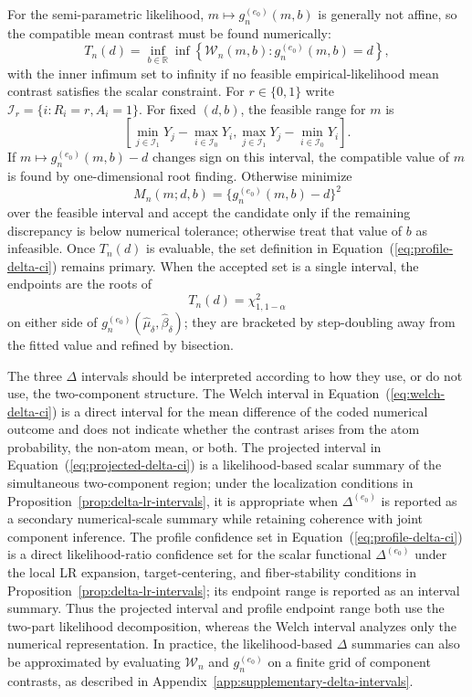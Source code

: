 \documentclass[11pt]{article}
\begin{document}
For the semi-parametric likelihood, $m\mapsto g_n^{(e_0)}(m,b)$ is generally not affine, so the compatible mean contrast must be found numerically:
\[
  T_n(d)
  =
  \inf_{b\in\mathbb{R}}
  \inf\left\{
    \mathcal{W}_n(m,b):
    g_n^{(e_0)}(m,b)=d
  \right\},
\]
with the inner infimum set to infinity if no feasible empirical-likelihood mean contrast satisfies the scalar constraint. For $r\in\{0,1\}$ write $\mathcal{I}_r=\{i:R_i=r,A_i=1\}$. For fixed $(d,b)$, the feasible range for $m$ is
\[
  \left[
    \min_{j\in\mathcal{I}_1}Y_j-
    \max_{i\in\mathcal{I}_0}Y_i,
    \max_{j\in\mathcal{I}_1}Y_j-
    \min_{i\in\mathcal{I}_0}Y_i
  \right].
\]
If $m\mapsto g_n^{(e_0)}(m,b)-d$ changes sign on this interval, the compatible value of $m$ is found by one-dimensional root finding. Otherwise minimize
\[
  M_n(m;d,b)=\{g_n^{(e_0)}(m,b)-d\}^2
\]
over the feasible interval and accept the candidate only if the remaining discrepancy is below numerical tolerance; otherwise treat that value of $b$ as infeasible. Once $T_n(d)$ is evaluable, the set definition in Equation~(\ref{eq:profile-delta-ci}) remains primary. When the accepted set is a single interval, the endpoints are the roots of
\[
  T_n(d)=\chi^2_{1,1-\alpha}
\]
on either side of $g_n^{(e_0)}(\widehat{\mu}_\delta,\widehat{\beta}_\delta)$; they are bracketed by step-doubling away from the fitted value and refined by bisection.

The three $\Delta$ intervals should be interpreted according to how they use, or do not use, the two-component structure. The Welch interval in Equation~(\ref{eq:welch-delta-ci}) is a direct interval for the mean difference of the coded numerical outcome and does not indicate whether the contrast arises from the atom probability, the non-atom mean, or both. The projected interval in Equation~(\ref{eq:projected-delta-ci}) is a likelihood-based scalar summary of the simultaneous two-component region; under the localization conditions in Proposition~\ref{prop:delta-lr-intervals}, it is appropriate when $\Delta^{(e_0)}$ is reported as a secondary numerical-scale summary while retaining coherence with joint component inference. The profile confidence set in Equation~(\ref{eq:profile-delta-ci}) is a direct likelihood-ratio confidence set for the scalar functional $\Delta^{(e_0)}$ under the local LR expansion, target-centering, and fiber-stability conditions in Proposition~\ref{prop:delta-lr-intervals}; its endpoint range is reported as an interval summary. Thus the projected interval and profile endpoint range both use the two-part likelihood decomposition, whereas the Welch interval analyzes only the numerical representation. In practice, the likelihood-based $\Delta$ summaries can also be approximated by evaluating $\mathcal{W}_n$ and $g_n^{(e_0)}$ on a finite grid of component contrasts, as described in Appendix~\ref{app:supplementary-delta-intervals}.
\end{document}
